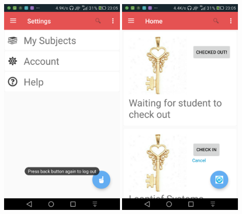 \documentclass[12pt]{article}
\begin{document}
\begin{flushleft}
\includegraphics[width=60mm]{./Sprint3Models/Screenshots/settings.png}
\includegraphics[width=60mm]{./Sprint3Models/Screenshots/check.png}
\end{flushleft}
\end{document}
